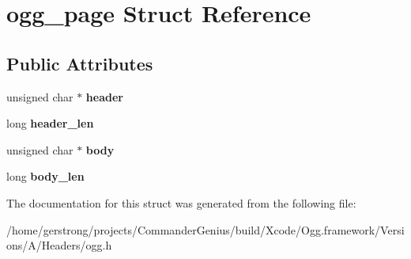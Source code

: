 \hypertarget{structogg__page}{
\section{ogg\_\-page Struct Reference}
\label{structogg__page}
}
\subsection*{Public Attributes}
\begin{DoxyCompactItemize}
\item 
\hypertarget{structogg__page_a9f251dc1a96fbfd84ff2585fbbc03c16}{
unsigned char $\ast$ {\bfseries header}}
\label{structogg__page_a9f251dc1a96fbfd84ff2585fbbc03c16}

\item 
\hypertarget{structogg__page_aeaa6edc2ff9f2c5cc8f0ecf001936b7b}{
long {\bfseries header\_\-len}}
\label{structogg__page_aeaa6edc2ff9f2c5cc8f0ecf001936b7b}

\item 
\hypertarget{structogg__page_af2fdee76f20ac267c6233f1d5f8afd30}{
unsigned char $\ast$ {\bfseries body}}
\label{structogg__page_af2fdee76f20ac267c6233f1d5f8afd30}

\item 
\hypertarget{structogg__page_ac6e649f0001899b512935448a903abac}{
long {\bfseries body\_\-len}}
\label{structogg__page_ac6e649f0001899b512935448a903abac}

\end{DoxyCompactItemize}


The documentation for this struct was generated from the following file:\begin{DoxyCompactItemize}
\item 
/home/gerstrong/projects/CommanderGenius/build/Xcode/Ogg.framework/Versions/A/Headers/ogg.h\end{DoxyCompactItemize}
